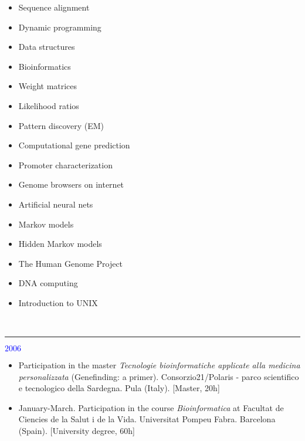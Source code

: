 
\vspace{0.5cm}

\begin{itemize}
\item Sequence alignment
\item Dynamic programming
\item Data structures
\item Bioinformatics
\item Weight matrices
\item Likelihood ratios
\item Pattern discovery (EM)
\item Computational gene prediction
\item Promoter characterization
\item Genome browsers on internet
\item Artificial neural nets
\item Markov models
\item Hidden Markov models
\item The Human Genome Project
\item DNA computing
\item Introduction to UNIX
\end{itemize}

\vspace{0.5cm}
\\

\textcolor{blue}{\rule{3mm}{3mm}{\Large $2006$}}

\begin{itemize}
\item Participation in the master \emph{Tecnologie bioinformatiche applicate alla medicina personalizzata} (Genefinding: 
a primer). Consorzio21/Polaris - parco scientifico e tecnologico della Sardegna. Pula (Italy). [Master, 20h]

\item January-March. Participation in the course \emph{Bioinformatica} at Facultat de Ciencies
de la Salut i de la Vida. Universitat Pompeu Fabra. Barcelona (Spain). [University degree, 60h]\\
\end{itemize}

